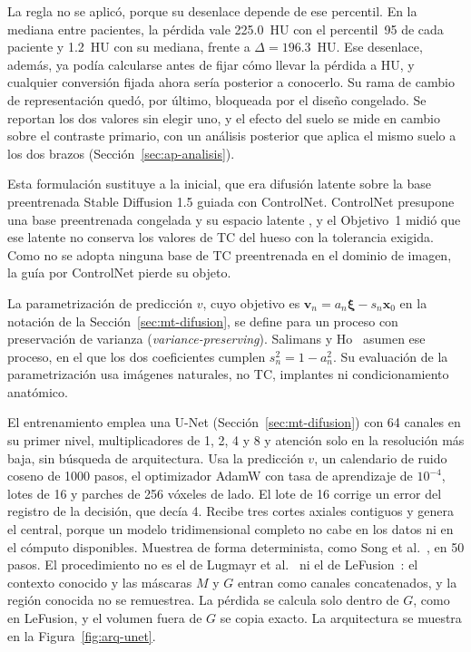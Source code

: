 La regla no se aplicó, porque su desenlace depende de ese percentil. En la mediana entre pacientes, la pérdida vale 225.0~HU con el percentil~95 de cada paciente y 1.2~HU con su mediana, frente a $\Delta = 196.3$~HU. Ese desenlace, además, ya podía calcularse antes de fijar cómo llevar la pérdida a HU, y cualquier conversión fijada ahora sería posterior a conocerlo. Su rama de cambio de representación quedó, por último, bloqueada por el diseño congelado. Se reportan los dos valores sin elegir uno, y el efecto del suelo se mide en cambio sobre el contraste primario, con un análisis posterior que aplica el mismo suelo a los dos brazos (Sección~\ref{sec:ap-analisis}).

Esta formulación sustituye a la inicial, que era difusión latente sobre la base preentrenada Stable Diffusion 1.5 guiada con ControlNet. ControlNet presupone una base preentrenada congelada y su espacio latente \cite{zhang2023controlnet}, y el Objetivo~1 midió que ese latente no conserva los valores de TC del hueso con la tolerancia exigida. Como no se adopta ninguna base de TC preentrenada en el dominio de imagen, la guía por ControlNet pierde su objeto.

La parametrización de predicción $v$, cuyo objetivo es $\mathbf{v}_n = a_n\boldsymbol{\xi} - s_n\mathbf{x}_0$ en la notación de la Sección~\ref{sec:mt-difusion}, se define para un proceso con preservación de varianza (\emph{variance-preserving}). Salimans y Ho~\cite{salimans2022progressive} asumen ese proceso, en el que los dos coeficientes cumplen $s_n^2 = 1 - a_n^2$. Su evaluación de la parametrización usa imágenes naturales, no TC, implantes ni condicionamiento anatómico.

El entrenamiento emplea una U-Net (Sección~\ref{sec:mt-difusion}) con 64 canales en su primer nivel, multiplicadores de 1, 2, 4 y 8 y atención solo en la resolución más baja, sin búsqueda de arquitectura. Usa la predicción $v$, un calendario de ruido coseno de 1000 pasos, el optimizador AdamW con tasa de aprendizaje de $10^{-4}$, lotes de 16 y parches de 256 vóxeles de lado. El lote de 16 corrige un error del registro de la decisión, que decía 4. Recibe tres cortes axiales contiguos y genera el central, porque un modelo tridimensional completo no cabe en los datos ni en el cómputo disponibles. Muestrea de forma determinista, como Song et al.~\cite{song2021ddim}, en 50 pasos. El procedimiento no es el de Lugmayr et al.~\cite{lugmayr2022repaint} ni el de LeFusion~\cite{zhang2025lefusion}: el contexto conocido y las máscaras $M$ y $G$ entran como canales concatenados, y la región conocida no se remuestrea. La pérdida se calcula solo dentro de $G$, como en LeFusion, y el volumen fuera de $G$ se copia exacto. La arquitectura se muestra en la Figura~\ref{fig:arq-unet}.

